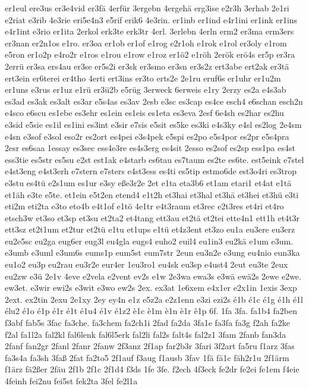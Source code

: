 {er1eul
ere3us
er3e4vid
er3fä
4erfür
3ergebn
4ergehä
erg3ise
e2r3h
3erhab
2e1ri
e2riat
e3rib
4e3rie
eri5e4n3
e5rif
erik6
4e3rin.
er1inb
er1ind
e4r1ini
er1ink
er1ins
e4r1int
e3rio
er1ita
2erkol
erk3te
erk3tr
4erl.
3erlebn
4erln
erm2
er3ma
erm3ers
er3nan
er2n1os
e1ro.
er3oa
er1ob
er1of
e1rog
e2r1oh
e1rok
e1rol
er3oly
e1rom
e5ron
er1o2p
e4ro2r
e1ros
e1rou
e1row
e1roz
er1ö2
e1röh
2erök
erö4s
er5p
er3ra
2errü
er3sa
ers4au
er3se
er5s2i
er3sk
er3smo
er3sn
er3s2z
ert3abe
ert2ak
er3tä
ert3ein
er6terei
er4tho
4erti
ert3ins
er3to
erts2e
2e1ru
eruf6s
er1uhr
er1u2m
er1uns
e3rus
er1uz
e1rü
er3ü2b
e5rüg
3erweck
6erweis
e1ry
2erzy
es2a
e4s3ab
es3ad
es3ak
es3alt
es3ar
e5s4as
es3av
2esb
e3sc
es3cap
es4ce
esch4
e6schan
esch2n
e4sco
e6scu
es1ebe
es3ehr
es1ein
es1eis
es1eta
es3eva
2esf
6e4sh
es2har
es2hu
e3sid
e5sie
es1il
es1ini
es3int
e3sir
e7sis
e5sit
es5ke
es3ki
e4s3ky
e4sl
es2log
2e4sm
e4sn
e3sof
e3sol
eso2r
es2ort
es4pei
e3s4pek
e5spi
es2po
e5s4por
es2pr
e5s4pra
2esr
es6saa
1essay
es3sec
ess4e3re
es4s3erg
es4sit
2esso
es2sof
es2sp
ess1pa
es4st
ess3tie
es5str
es5su
e2st
est1ak
e4starb
es6tau
es7taum
es2te
es6te.
est5eink
e7stel
e4st3eng
e4st3erh
e7stern
e7sters
e4st3ess
es4ti
es5tip
estmo6de
est3o4ri
es3trop
e3stu
es4tü
e2s1um
es1ur
e3sy
eße3r2e
2et
e1ta
eta3b6
et1am
etari1
et4at
e1tä
et1äh
e3te
e5te.
et1ein
e5t2en
etend4
e1t2h
et3hai
et3hal
et3hä
et3hei
et3hü
e3ti
eti2m
eti2ta
e3to
eto4b
e4t1of
e1tö
4e1tr
e4t3raum
et3rec
e2t3res
et4ri
et4ro
etsch3w
et3so
et3sp
et3su
et2ta2
et4tang
ett3au
et2tä
et2tei
ette4n1
ett1h
et4t3r
ett3sz
et2t1um
et2tur
et2tü
e1tu
et1ups
e1tü
et4z3ent
et3zo
eu1a
eu3ere
eu3erz
eu2e5sc
eu2ga
eug6er
eug3l
eu4gla
eugs4
euho2
euil4
eu1in3
eu2kä
e1um
e3um.
e3umb
e3uml
e3um6s
eums1p
eum5st
eum7str
2eun
eu3n2e
e3ung
eu4nio
eun3ka
eu1o2
eu3p
eu2rau
eu3r2e
eur4er
1eu3ro1
eu4sk
eu3sp
e4ust4
2eut
eu3te
2eux
eu2zw
e3ü
2e1v
4eve
e2vela
e2vent
ev2s
e1w
2e3wa
ewa3s
e3wä
ewä2s
2ewe
e2we.
ew3et.
e3wir
ewi2s
e3wit
e3wo
ew2s
2ex.
ex3at
1e6xem
e4x1er
e2x1in
1exis
3exp
2ext.
ex2tin
2exu
2e1xy
2ey
ey4n
e1z
e5z2a
e2z1enn
e3zi
ezi2s
é1b
é1c
é1g
é1h
é1l
élu2
é1o
é1p
é1r
é1t
é1u4
é1v
é1z2
è1c
è1m
è1n
è1r
ê1p
6f.
1fa
3fa.
fa1b4
fa2ben
f3abf
fab5s
3fac
fa3che.
fa3chem
fa2ch1i
2fad
fa2da
3fa1e
fa3fa
fa3g
f2ah
fa2ke
f2al
fa1l2a
fal2kl
fal6lenk
fal6l5erk
fal2li
fal2s
falt4s
fal2z1
3fam
2fanb
fan3da
2fanf
fan2gr
2fanl
2fanr
2fanw
2f3anz
2f1ap
far2b3r
3fari
3f2art
fa5ru
f1arz
3fas
fa3s4a
fa3sh
3faß
2fat
fa2to5
2f1auf
f3aug
f1ausb
3fav
1fä
fä1c
fäh2r1u
2f1ärm
f1ärz
fä2ßer
2fäu
2f1b
2f1c
2f1d4
f3ds
1fe
3fe.
f2ech
4f3eck
fe2dr
fe2ei
fe1em
f4eie
4feinh
fei2nu
fei5st
fek2ta
3fel
fe2l1a
}
